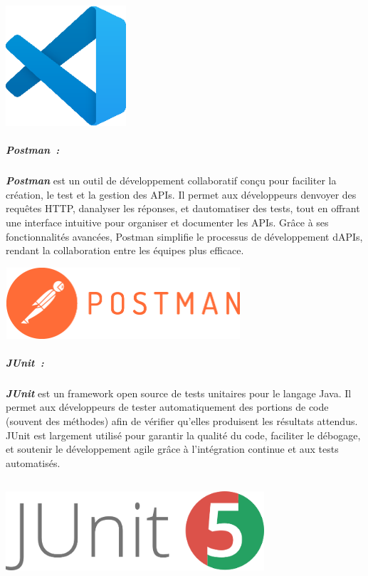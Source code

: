 \documentclass[12pt,a4paper,twoside]{report}
\begin{document}
\includegraphics[width=1.76177in,height=1.76177in]{latex_media/media/image32.png}

\hypertarget{postman}{%
\subparagraph{Postman~:}\label{postman}}

\emph{\textbf{Postman}} est un outil de développement collaboratif conçu
pour faciliter la création, le test et la gestion des APIs. Il permet
aux développeurs d\textquotesingle envoyer des requêtes HTTP,
d\textquotesingle analyser les réponses, et
d\textquotesingle automatiser des tests, tout en offrant une interface
intuitive pour organiser et documenter les APIs. Grâce à ses
fonctionnalités avancées, Postman simplifie le processus de
développement d\textquotesingle APIs, rendant la collaboration entre les
équipes plus efficace.

\includegraphics[width=3.43681in,height=1.03958in]{latex_media/media/image33.png}

\hypertarget{junit}{%
\subparagraph{JUnit~:}\label{junit}}

\emph{\textbf{JUnit}} est un framework open source de tests unitaires
pour le langage Java. Il permet aux développeurs de tester
automatiquement des portions de code (souvent des méthodes) afin de
vérifier qu'elles produisent les résultats attendus. JUnit est largement
utilisé pour garantir la qualité du code, faciliter le débogage, et
soutenir le développement agile grâce à l'intégration continue et aux
tests automatisés.

\includegraphics[width=3.78403in,height=1.48333in]{latex_media/media/image34.png}
\end{document}
